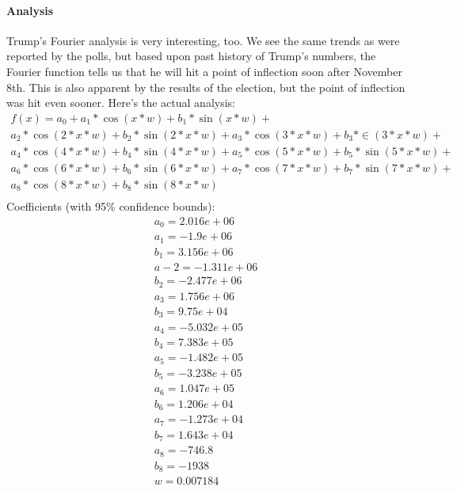 \documentclass[twoside]{article}
\begin{document}
\paragraph{Analysis} Trump's Fourier analysis is very interesting, too. We see the same trends as were reported by the polls, but based upon past history of Trump's numbers,
the Fourier function tells us that he will hit a point of inflection soon after November 8th. This is also apparent by the results of the election, but the point of inflection
was hit even sooner. Here's the actual analysis:
\newpage
\begin{gather*}
f(x) =
          a_0 + a_1*\cos(x*w) + b_1*\sin(x*w) +\\
          a_2*\cos(2*x*w) + b_2*\sin(2*x*w) + a_3*\cos(3*x*w) + b_3*\in(3*x*w) +\\
          a_4*\cos(4*x*w) + b_4*\sin(4*x*w) + a_5*\cos(5*x*w) + b_5*\sin(5*x*w) +\\
          a_6*\cos(6*x*w) + b_6*\sin(6*x*w) + a_7*\cos(7*x*w) + b_7*\sin(7*x*w) +\\
          a_8*\cos(8*x*w) + b_8*\sin(8*x*w)\\
\end{gather*}
Coefficients (with 95\% confidence bounds):
\begin{gather*}
  a_0 =   2.016e+06\\
  a_1 =    -1.9e+06  \\
  b_1 =   3.156e+06  \\
  a-2 =  -1.311e+06  \\
  b_2 =  -2.477e+06  \\
  a_3 =   1.756e+06  \\
  b_3 =    9.75e+04  \\
  a_4 =  -5.032e+05  \\
  b_4 =   7.383e+05  \\
  a_5 =  -1.482e+05  \\
  b_5 =  -3.238e+05  \\
  a_6 =   1.047e+05  \\
  b_6 =   1.206e+04  \\
  a_7 =  -1.273e+04  \\
  b_7 =   1.643e+04  \\
  a_8 =      -746.8  \\
  b_8 =       -1938  \\
  w =    0.007184 \\
\end{gather*}
\end{document}
